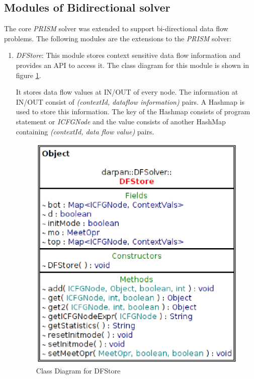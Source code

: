 \documentclass[11pt,a4paper,openright]{report}
\begin{document}
\subsection*{Modules of Bidirectional solver}
The  core \emph{PRISM} solver was extended to support bi-directional data flow problems. 
The following modules are the extensions to the \emph{PRISM} solver:

\begin{enumerate}
\item \emph{DFStore}: This module stores context sensitive data flow information and provides an API to access it. The class diagram for this module 
is shown in figure \ref{fig:dfstore}.

It stores data flow values at IN/OUT of every node. The information at IN/OUT consist of \emph{(contextId, dataflow information)} pairs. 
A Hashmap is used to store this information. The key of the Hashmap consists of program statement or \emph{ICFGNode} and the value consists
of another HashMap containing \emph{(contextId, data flow value)} pairs.

% 



\begin{figure}
\includegraphics[scale=0.8]{class_diagrams/updatedClassDiagrams/DFStore_C.eps}
\caption{Class Diagram for DFStore}
\label{fig:dfstore}
\end{figure}



\end{enumerate}
\end{document}
